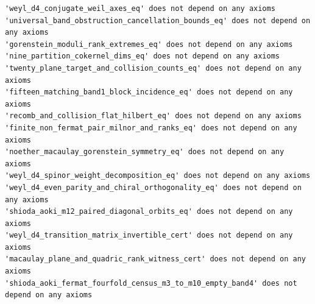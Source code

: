 \documentclass[11pt,a4paper]{article}
\begin{document}
\begin{lstlisting}[style=leancode]
'weyl_d4_conjugate_weil_axes_eq' does not depend on any axioms
'universal_band_obstruction_cancellation_bounds_eq' does not depend on any axioms
'gorenstein_moduli_rank_extremes_eq' does not depend on any axioms
'nine_partition_cokernel_dims_eq' does not depend on any axioms
'twenty_plane_target_and_collision_counts_eq' does not depend on any axioms
'fifteen_matching_band1_block_incidence_eq' does not depend on any axioms
'recomb_and_collision_flat_hilbert_eq' does not depend on any axioms
'finite_non_fermat_pair_milnor_and_ranks_eq' does not depend on any axioms
'noether_macaulay_gorenstein_symmetry_eq' does not depend on any axioms
'weyl_d4_spinor_weight_decomposition_eq' does not depend on any axioms
'weyl_d4_even_parity_and_chiral_orthogonality_eq' does not depend on any axioms
'shioda_aoki_m12_paired_diagonal_orbits_eq' does not depend on any axioms
'weyl_d4_transition_matrix_invertible_cert' does not depend on any axioms
'macaulay_plane_and_quadric_rank_witness_cert' does not depend on any axioms
'shioda_aoki_fermat_fourfold_census_m3_to_m10_empty_band4' does not depend on any axioms
\end{lstlisting}
\end{document}
